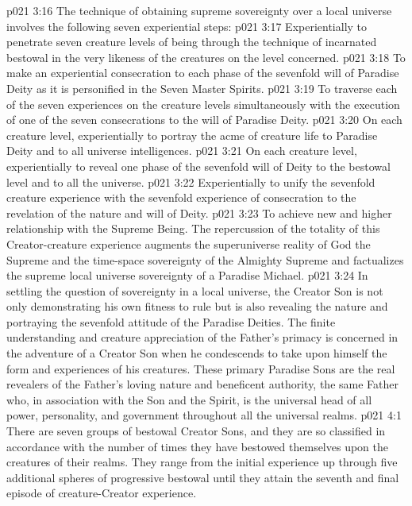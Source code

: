 \pc \vs p021 3:16 The technique of obtaining supreme sovereignty over a local universe involves the following seven experiential steps:
\pc \vs p021 3:17 \bibnobreakspace Experientially to penetrate seven creature levels of being through the technique of incarnated bestowal in the very likeness of the creatures on the level concerned.
\pc \vs p021 3:18 \bibnobreakspace To make an experiential consecration to each phase of the sevenfold will of Paradise Deity as it is personified in the Seven Master Spirits.
\pc \vs p021 3:19 \bibnobreakspace To traverse each of the seven experiences on the creature levels simultaneously with the execution of one of the seven consecrations to the will of Paradise Deity.
\pc \vs p021 3:20 \bibnobreakspace On each creature level, experientially to portray the acme of creature life to Paradise Deity and to all universe intelligences.
\pc \vs p021 3:21 \bibnobreakspace On each creature level, experientially to reveal one phase of the sevenfold will of Deity to the bestowal level and to all the universe.
\pc \vs p021 3:22 \bibnobreakspace Experientially to unify the sevenfold creature experience with the sevenfold experience of consecration to the revelation of the nature and will of Deity.
\pc \vs p021 3:23 \bibnobreakspace To achieve new and higher relationship with the Supreme Being. The repercussion of the totality of this Creator\hyp{}creature experience augments the superuniverse reality of God the Supreme and the time\hyp{}space sovereignty of the Almighty Supreme and factualizes the supreme local universe sovereignty of a Paradise Michael.
\pc \vs p021 3:24 In settling the question of sovereignty in a local universe, the Creator Son is not only demonstrating his own fitness to rule but is also revealing the nature and portraying the sevenfold attitude of the Paradise Deities. The finite understanding and creature appreciation of the Father’s primacy is concerned in the adventure of a Creator Son when he condescends to take upon himself the form and experiences of his creatures. These primary Paradise Sons are the real revealers of the Father’s loving nature and beneficent authority, the same Father who, in association with the Son and the Spirit, is the universal head of all power, personality, and government throughout all the universal realms.
\vs p021 4:1 There are seven groups of bestowal Creator Sons, and they are so classified in accordance with the number of times they have bestowed themselves upon the creatures of their realms. They range from the initial experience up through five additional spheres of progressive bestowal until they attain the seventh and final episode of creature\hyp{}Creator experience.
